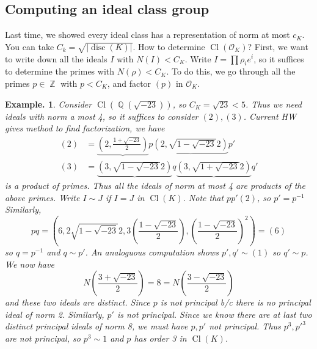 \documentclass[11pt, a4paper]{memoir}
\DeclareMathOperator{\Q}{{\mathbb{Q}}}
\DeclareMathOperator{\Z}{{\mathbb{Z}}}
\theoremstyle{change}
\theoremstyle{plain}
\theoremstyle{nonumberplain}
\newtheorem{example}{Example.}
\DeclareMathOperator{\disc}{disc}
\DeclareMathOperator{\Cl}{Cl}
\numberwithin{equation}{section}
\begin{document}
\subsection{Computing an ideal class group}
Last time, we showed every ideal class has a representation of norm at most $c_K$.
You can take $C_k=\sqrt{|\disc(K)|}$.
How to determine $\Cl(\mathcal{O}_K)$?
First, we want to write down all the ideals $I$ with $N(I)<C_K$.
Write $I=\prod\rho_i e^i$, so it suffices to determine the primes with $N(\rho)<C_K$.
To do this, we go through all the primes $p\in\Z$ with $p<C_K$, and factor $(p)$ in $\mathcal{O}_K$.
\begin{example}
    Consider $\Cl(\Q(\sqrt{-23}))$, so $C_K=\sqrt{23}<5$.
    Thus we need ideals with norm a most 4, so it suffices to consider $(2),(3)$.
    Current HW gives method to find factorization, we have
    \begin{align*}
        (2)&=\underbrace{\left(2,\frac{1+\sqrt{-23}}{2}\right)}{p}\underbrace{\left(2,\sqrt{1-\sqrt{-23}}{2}\right)}{p'}\\
        (3)&=\underbrace{\left(3,\sqrt{1-\sqrt{-23}}{2}\right)}{q}\underbrace{\left(3,\sqrt{1+\sqrt{-23}}{2}\right)}{q'}
    \end{align*}
    is a product of primes.
    Thus all the ideals of norm at most 4 are products of the above primes.
    Write $I\sim J$ if $I=J$ in $\Cl(K)$.
    Note that $pp'(2)$, so $p'=p^{-1}$
    Similarly,
    \begin{equation*}
        pq=\left(6,2\sqrt{1-\sqrt{-23}}{2},3\left(\frac{1-\sqrt{-23}}{2}\right),\left(\frac{1-\sqrt{-23}}{2}\right)^2\right)=(6)
    \end{equation*}
    so $q=p^{-1}$ and $q\sim p'$.
    An analoguous computation shows $p',q'\sim(1)$ so $q'\sim p$.
    We now have
    \begin{equation*}
        N\left(\frac{3+\sqrt{-23}}{2}\right)=8=N\left(\frac{3-\sqrt{-23}}{2}\right)
    \end{equation*}
    and these two ideals are distinct.
    Since $p$ is not principal b/c there is no principal ideal of norm 2.
    Similarly, $p'$ is not principal.
    Since we know there are at last two distinct principal ideals of norm 8, we must have $p,p'$ not principal.
    Thus $p^3,p'^3$ are not principal, so $p^3\sim 1$ and $p$ has order 3 in $\Cl(K)$.
\end{example}
\end{document}
